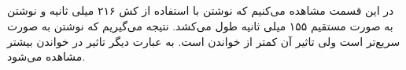 \documentclass{article}
\begin{document}
\subsection{}
در این قسمت مشاهده می‌کنیم که نوشتن با استفاده از کش 
۲۱۶ میلی ثانیه 
و نوشتن به صورت مستقیم ۱۵۵ میلی ثانیه طول می‌کشد.
نتیجه می‌گیریم که نوشتن به صورت 
سریع‌تر است ولی تاثیر آن کمتر از خواندن است. به عبارت دیگر تاثیر 
در خواندن بیشتر مشاهده می‌شود.

\section{}
\subsection{}
\subsection{}
\subsection{}
\subsection{}
\subsection{}

\section{}
\subsection{}
\subsection{}
\subsection{}
\subsection{}
\subsection{}
\end{document}
